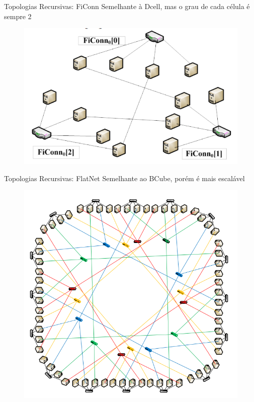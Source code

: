 \documentclass[aspectratio=169]{beamer}
\begin{document}
	\begin{frame} {Topologias Recursivas: FiConn}
		Semelhante à Dcell, mas o grau de cada célula é sempre 2
		\begin{figure}[ht]    
			\includegraphics[scale=0.3]{imagens/ficonn.png}
			\label{fig:sample_figure}
		\end{figure}
	\end{frame}

	\begin{frame} {Topologias Recursivas: FlatNet}
		Semelhante ao BCube, porém é mais escalável
		\begin{figure}[ht]    
			\includegraphics[scale=0.3]{imagens/flatnet.png}
			\label{fig:sample_figure}
		\end{figure}
	\end{frame}
\end{document}
